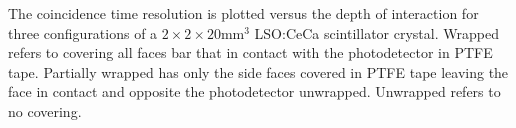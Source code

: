\label{fig:ctrdoi-20} The coincidence time resolution is plotted versus the depth of interaction for three configurations of a $2\times2\times20$mm$^3$ LSO:CeCa scintillator crystal. Wrapped refers to covering all faces bar that in contact with the photodetector in PTFE tape. Partially wrapped has only the side faces covered in PTFE tape leaving the face in contact and opposite the photodetector unwrapped. Unwrapped refers to no covering.